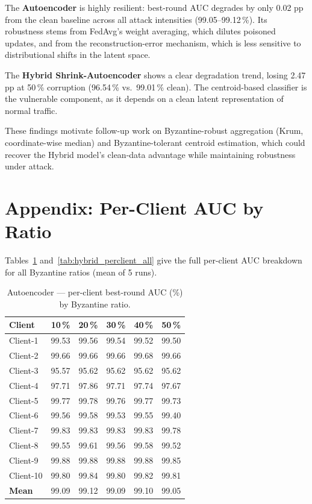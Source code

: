 \documentclass[11pt,a4paper]{article}
\begin{document}
The \textbf{Autoencoder} is highly resilient: best-round AUC degrades by only 0.02 pp
from the clean baseline across all attack intensities (99.05--99.12\,\%).
Its robustness stems from FedAvg's weight averaging, which dilutes poisoned updates, and
from the reconstruction-error mechanism, which is less sensitive to distributional shifts
in the latent space.

The \textbf{Hybrid Shrink-Autoencoder} shows a clear degradation trend, losing 2.47 pp
at 50\,\% corruption (96.54\,\% vs.\ 99.01\,\% clean).
The centroid-based classifier is the vulnerable component, as it depends on a clean latent
representation of normal traffic.

These findings motivate follow-up work on Byzantine-robust aggregation (Krum,
coordinate-wise median) and Byzantine-tolerant centroid estimation, which could recover
the Hybrid model's clean-data advantage while maintaining robustness under attack.

\appendix
\section{Appendix: Per-Client AUC by Ratio}

Tables~\ref{tab:ae_perclient_all} and~\ref{tab:hybrid_perclient_all} give the full
per-client AUC breakdown for all Byzantine ratios (mean of 5 runs).

\begin{table}[h]
\centering
\caption{Autoencoder --- per-client best-round AUC (\%) by Byzantine ratio.}
\label{tab:ae_perclient_all}
\begin{tabular}{l rrrrr}
\toprule
\textbf{Client} & \textbf{10\,\%} & \textbf{20\,\%} & \textbf{30\,\%} & \textbf{40\,\%} & \textbf{50\,\%} \\
\midrule
Client-1   & 99.53 & 99.56 & 99.54 & 99.52 & 99.50 \\
Client-2   & 99.66 & 99.66 & 99.66 & 99.68 & 99.66 \\
Client-3   & 95.57 & 95.62 & 95.62 & 95.62 & 95.62 \\
Client-4   & 97.71 & 97.86 & 97.71 & 97.74 & 97.67 \\
Client-5   & 99.77 & 99.78 & 99.76 & 99.77 & 99.73 \\
Client-6   & 99.56 & 99.58 & 99.53 & 99.55 & 99.40 \\
Client-7   & 99.83 & 99.83 & 99.83 & 99.83 & 99.78 \\
Client-8   & 99.55 & 99.61 & 99.56 & 99.58 & 99.52 \\
Client-9   & 99.88 & 99.88 & 99.88 & 99.88 & 99.85 \\
Client-10  & 99.80 & 99.84 & 99.80 & 99.82 & 99.81 \\
\midrule
\textbf{Mean} & 99.09 & 99.12 & 99.09 & 99.10 & 99.05 \\
\bottomrule
\end{tabular}
\end{table}
\end{document}
